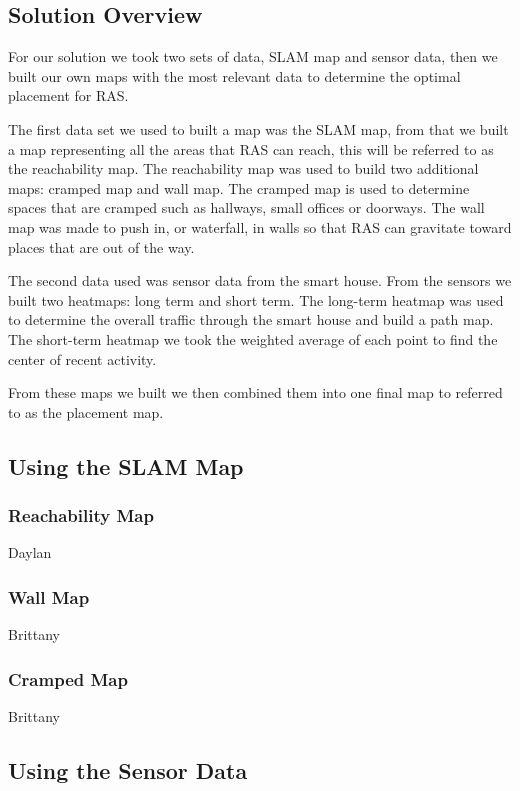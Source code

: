 \documentclass[11pt, conference, a4paper]{IEEEtran}
\begin{document}
\subsection{Solution Overview}
For our solution we took two sets of data, SLAM map and sensor data, then we built our own maps with the most relevant data to determine the optimal placement for RAS. 

The first data set we used to built a map was the SLAM map, from that we built a map representing all the areas that RAS can reach, this will be referred to as the reachability map. The reachability map was used to build two additional maps: cramped map and wall map. The cramped map is used to determine spaces that are cramped such as hallways, small offices or doorways. The wall map was made to push in, or waterfall, in walls so that RAS can gravitate toward places that are out of the way. 

The second data used was sensor data from the smart house. From the sensors we built two heatmaps: long term and short term. The long-term heatmap was used to determine the overall traffic through the smart house and build a path map. The short-term heatmap we took the weighted average of each point to find the center of recent activity.

From these maps we built we then combined them into one final map to referred to as the placement map. 


\subsection{Using the SLAM Map}


\subsubsection{Reachability Map}
Daylan


\subsubsection{Wall Map}
Brittany


\subsubsection{Cramped Map}
Brittany




\subsection{Using the Sensor Data}
\end{document}
